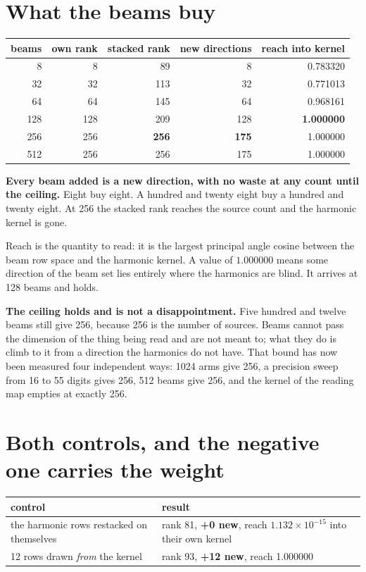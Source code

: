 \section{What the beams buy}

\begin{center}
\begin{tabular}{@{}rrrrr@{}}
\toprule
beams & own rank & stacked rank & new directions & reach into kernel \\
\midrule
8 & 8 & 89 & 8 & 0.783320 \\
32 & 32 & 113 & 32 & 0.771013 \\
64 & 64 & 145 & 64 & 0.968161 \\
128 & 128 & 209 & 128 & \textbf{1.000000} \\
256 & 256 & \textbf{256} & \textbf{175} & 1.000000 \\
512 & 256 & 256 & 175 & 1.000000 \\
\bottomrule
\end{tabular}
\end{center}

\textbf{Every beam added is a new direction, with no waste at any count until the ceiling.} Eight buy
eight. A hundred and twenty eight buy a hundred and twenty eight. At 256 the stacked rank reaches the
source count and the harmonic kernel is gone.

Reach is the quantity to read: it is the largest principal angle cosine between the beam row space
and the harmonic kernel. A value of \(1.000000\) means some direction of the beam set lies entirely where the
harmonics are blind. It arrives at 128 beams and holds.

\textbf{The ceiling holds and is not a disappointment.} Five hundred and twelve beams still give 256,
because 256 is the number of sources. Beams cannot pass the dimension of the thing being read and are
not meant to; what they do is climb to it from a direction the harmonics do not have. That bound has
now been measured four independent ways: 1024 arms give 256, a precision sweep from 16 to 55 digits
gives 256, 512 beams give 256, and the kernel of the reading map empties at exactly 256.

\section{Both controls, and the negative one carries the weight}

\begin{center}
\begin{tabular}{@{}ll@{}}
\toprule
control & result \\
\midrule
the harmonic rows restacked on themselves & rank 81, \textbf{+0 new}, reach \(1.132 \times 10^{-15}\) into their own kernel \\
12 rows drawn \emph{from} the kernel & rank 93, \textbf{+12 new}, reach 1.000000 \\
\bottomrule
\end{tabular}
\end{center}

